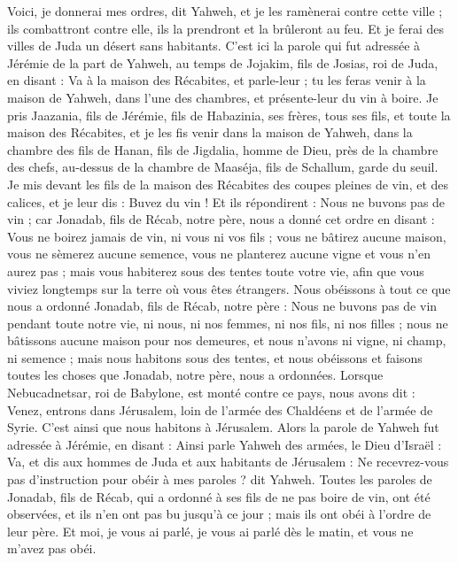 \begin{multicols}{2}
Voici, je donnerai mes ordres, dit Yahweh, et je les ramènerai contre cette ville ; ils combattront contre elle, ils la prendront et la brûleront au feu. Et je ferai des villes de Juda un désert sans habitants.
\VerseOne{}C'est ici la parole qui fut adressée à Jérémie de la part de Yahweh, au temps de Jojakim, fils de Josias, roi de Juda, en disant :
Va à la maison des Récabites, et parle-leur ; tu les feras venir à la maison de Yahweh, dans l'une des chambres, et présente-leur du vin à boire.
Je pris Jaazania, fils de Jérémie, fils de Habazinia, ses frères, tous ses fils, et toute la maison des Récabites,
et je les fis venir dans la maison de Yahweh, dans la chambre des fils de Hanan, fils de Jigdalia, homme de Dieu, près de la chambre des chefs, au-dessus de la chambre de Maaséja, fils de Schallum, garde du seuil.
Je mis devant les fils de la maison des Récabites des coupes pleines de vin, et des calices, et je leur dis : Buvez du vin !
Et ils répondirent : Nous ne buvons pas de vin ; car Jonadab, fils de Récab, notre père, nous a donné cet ordre en disant : Vous ne boirez jamais de vin, ni vous ni vos fils ;
vous ne bâtirez aucune maison, vous ne sèmerez aucune semence, vous ne planterez aucune vigne et vous n'en aurez pas ; mais vous habiterez sous des tentes toute votre vie, afin que vous viviez longtemps sur la terre où vous êtes étrangers.
Nous obéissons à tout ce que nous a ordonné Jonadab, fils de Récab, notre père : Nous ne buvons pas de vin pendant toute notre vie, ni nous, ni nos femmes, ni nos fils, ni nos filles ;
nous ne bâtissons aucune maison pour nos demeures, et nous n'avons ni vigne, ni champ, ni semence ;
mais nous habitons sous des tentes, et nous obéissons et faisons toutes les choses que Jonadab, notre père, nous a ordonnées.
Lorsque Nebucadnetsar, roi de Babylone, est monté contre ce pays, nous avons dit : Venez, entrons dans Jérusalem, loin de l'armée des Chaldéens et de l'armée de Syrie. C'est ainsi que nous habitons à Jérusalem.
Alors la parole de Yahweh fut adressée à Jérémie, en disant :
Ainsi parle Yahweh des armées, le Dieu d'Israël : Va, et dis aux hommes de Juda et aux habitants de Jérusalem : Ne recevrez-vous pas d'instruction pour obéir à mes paroles ? dit Yahweh.
Toutes les paroles de Jonadab, fils de Récab, qui a ordonné à ses fils de ne pas boire de vin, ont été observées, et ils n'en ont pas bu jusqu'à ce jour ; mais ils ont obéi à l'ordre de leur père. Et moi, je vous ai parlé, je vous ai parlé dès le matin, et vous ne m'avez pas obéi.

\end{multicols}

